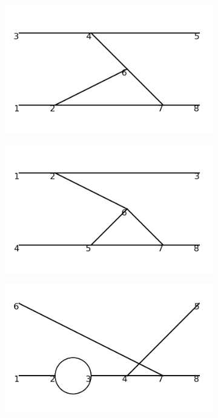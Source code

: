 \documentclass[11pt,a4paper,twoside,pdf]{article}
\numberwithin{equation}{section}
\begin{document}
\begin{figure}[h!]
\begin{subfigure}[t]{0.16\textwidth}
    \end{subfigure}
    \hfill
    \begin{subfigure}[t]{0.16\textwidth}
        \centering
        \includegraphics[width=\textwidth]{plots/order4_2to2/28.png}
    \end{subfigure}
    \hfill
    \begin{subfigure}[t]{0.16\textwidth}
        \centering
        \includegraphics[width=\textwidth]{plots/order4_2to2/29.png}
    \end{subfigure}
    \hfill
    \begin{subfigure}[t]{0.16\textwidth}
        \centering
        \includegraphics[width=\textwidth]{plots/order4_2to2/30.png}

\end{subfigure}
\end{figure}
\end{document}
